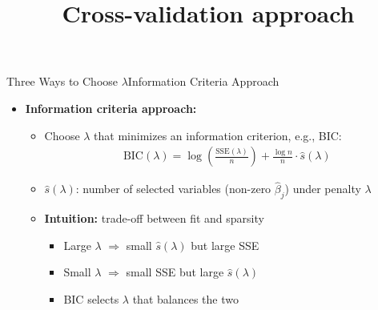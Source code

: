 \documentclass[dvipsnames,hyperref={pdfpagelabels=false}]{beamer}
\begin{document}
\begin{frame}{Three Ways to Choose $\lambda$}{Information Criteria Approach}
    \begin{itemize}
        \item[3] \textbf{Information criteria approach:}
        \vspace{0.2cm}
        \begin{itemize}
            \item Choose $\lambda$ that minimizes an information criterion, 
            e.g., BIC:
            \vspace{0.2cm}
            \begin{eqnarray*}
                \text{BIC}(\lambda) = \log\left(\frac{\text{SSE}(\lambda)}{n}\right) 
                + \frac{\log n}{n} \cdot \hat{s}(\lambda)
            \end{eqnarray*}
            \vspace{0.1cm}
            \item $\hat{s}(\lambda)$: number of selected variables 
            (non-zero $\hat{\beta}_j$) under penalty $\lambda$
            \vspace{0.2cm}
            \item \textbf{Intuition:} trade-off between fit and sparsity
            \begin{itemize}
                \vspace{0.1cm}
                \item Large $\lambda$ $\Rightarrow$ small $\hat{s}(\lambda)$ 
                but large SSE
                \vspace{0.1cm}
                \item Small $\lambda$ $\Rightarrow$ small SSE 
                but large $\hat{s}(\lambda)$
                \vspace{0.1cm}
                \item BIC selects $\lambda$ that balances the two
            \end{itemize}
        \end{itemize}
    \end{itemize}
\end{frame}



\title[]  
{Cross-validation approach}


\author 
{}

\institute{}
\end{document}

